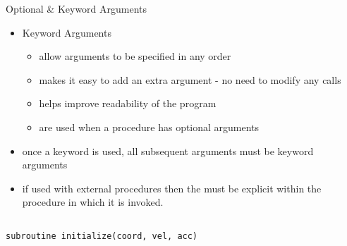 \documentclass[10pt,t]{beamer}
\begin{document}
\begin{frame}{Optional \& Keyword Arguments}
\begin{itemize}
\begin{columns}[t]
\begin{lstlisting}[language={[90]Fortran},basicstyle=\fontsize{4}{5}\selectfont\ttfamily,mathescape]
        \end{lstlisting}
        \begin{lstlisting}[language={[90]Fortran},basicstyle=\fontsize{4}{5}\selectfont\ttfamily,mathescape]
subroutine initialize(coord_t0, vel_t0, acc_t0)
$\cdots$
  interface
     subroutine linearmom(vel)
       use precision
       implicit none
       real(dp), dimension(:,:), intent(inout) :: vel
     end subroutine linearmom
     subroutine get_temp(vel, boltz)
       use precision
       implicit none
       real(dp), dimension(:,:), intent(in) :: vel
       real(dp), optional :: boltz
     end subroutine get_temp
  end interface
$\cdots$
  call get_temp(vel_t0)
$\cdots$
        \end{lstlisting}
      \end{columns}
    \item Keyword Arguments
      \begin{itemize}
        \item allow arguments to be specified in any order
        \item makes it easy to add an extra argument - no need to modify any calls
        \item helps improve readability of the program
        \item are used when a procedure has optional arguments
      \end{itemize}
    \item once a keyword is used, all subsequent arguments must be keyword arguments
    \item if used with external procedures then the  must be explicit within the procedure in which it is invoked.
  \end{itemize}

  \begin{columns}
    \column{5.5cm}
    \begin{lstlisting}[language={[90]Fortran},basicstyle=\fontsize{5}{6}\selectfont\ttfamily]
subroutine initialize(coord, vel, acc)


\end{lstlisting}
\end{columns}
\end{frame}
\end{document}
